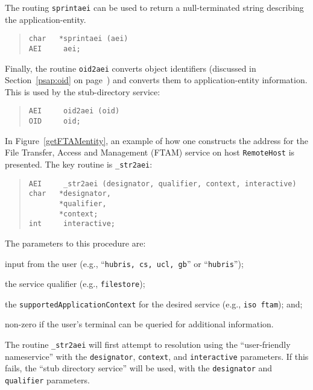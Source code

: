 The routing \verb"sprintaei" can be used to return a null-terminated
string describing the application-entity.
\begin{quote}\small\begin{verbatim}
char   *sprintaei (aei)
AEI     aei;
\end{verbatim}\end{quote}

Finally,
the routine \verb"oid2aei" converts object identifiers
(discussed in Section~\ref{psap:oid} on page~\pageref{psap:oid})
and converts them to application-entity information.
This is used by the stub-directory service:
\begin{quote}\small\begin{verbatim}
AEI     oid2aei (oid)
OID     oid;
\end{verbatim}\end{quote}

In Figure~\ref{getFTAMentity},
an example of how one constructs the address for the File Transfer, Access
and Management (FTAM) service on host \verb"RemoteHost" is presented.
The key routine is \verb"_str2aei":
\begin{quote}\small\begin{verbatim}
AEI     _str2aei (designator, qualifier, context, interactive)
char   *designator,
       *qualifier,
       *context;
int     interactive;
\end{verbatim}\end{quote}
The parameters to this procedure are:
\begin{describe}
\item[\verb"designator":] input from the user
(e.g., ``\verb"hubris, cs, ucl, gb"'' or ``\verb"hubris"'');

\item[\verb"qualifier":] the service qualifier (e.g., \verb"filestore");

\item[\verb"context":] the \verb"supportedApplicationContext" for the desired
service (e.g., \verb"iso ftam");
and;

\item[\verb"interactive":] non-zero if the user's terminal can be queried for
additional information.
\end{describe}
The routine \verb"_str2aei" will first attempt to resolution using the
``user-friendly nameservice'' with the \verb"designator", \verb"context", and
\verb"interactive" parameters.
If this fails,
the ``stub directory service'' will be used,
with the \verb"designator" and \verb"qualifier" parameters.

